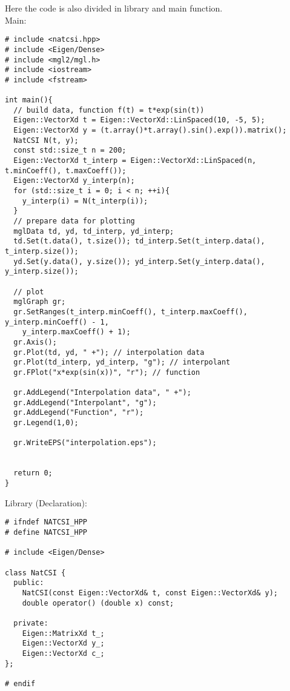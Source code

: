 \documentclass[a4paper]{article}
\begin{document}
Here the code is also divided in library and main function. \\
Main:
\begin{verbatim}
# include <natcsi.hpp>
# include <Eigen/Dense>
# include <mgl2/mgl.h>
# include <iostream>
# include <fstream>

int main(){
  // build data, function f(t) = t*exp(sin(t))
  Eigen::VectorXd t = Eigen::VectorXd::LinSpaced(10, -5, 5);
  Eigen::VectorXd y = (t.array()*t.array().sin().exp()).matrix();
  NatCSI N(t, y);
  const std::size_t n = 200;
  Eigen::VectorXd t_interp = Eigen::VectorXd::LinSpaced(n, t.minCoeff(), t.maxCoeff());
  Eigen::VectorXd y_interp(n);
  for (std::size_t i = 0; i < n; ++i){
    y_interp(i) = N(t_interp(i));
  }
  // prepare data for plotting
  mglData td, yd, td_interp, yd_interp;
  td.Set(t.data(), t.size()); td_interp.Set(t_interp.data(), t_interp.size());
  yd.Set(y.data(), y.size()); yd_interp.Set(y_interp.data(), y_interp.size());

  // plot
  mglGraph gr;
  gr.SetRanges(t_interp.minCoeff(), t_interp.maxCoeff(), y_interp.minCoeff() - 1, 
    y_interp.maxCoeff() + 1);
  gr.Axis();
  gr.Plot(td, yd, " +"); // interpolation data
  gr.Plot(td_interp, yd_interp, "g"); // interpolant
  gr.FPlot("x*exp(sin(x))", "r"); // function
  
  gr.AddLegend("Interpolation data", " +");
  gr.AddLegend("Interpolant", "g");
  gr.AddLegend("Function", "r");
  gr.Legend(1,0);

  gr.WriteEPS("interpolation.eps");


  return 0;
}
\end{verbatim}

Library (Declaration):
\begin{verbatim}
# ifndef NATCSI_HPP
# define NATCSI_HPP

# include <Eigen/Dense>

class NatCSI {
  public:
    NatCSI(const Eigen::VectorXd& t, const Eigen::VectorXd& y);
    double operator() (double x) const;

  private:
    Eigen::MatrixXd t_;
    Eigen::VectorXd y_;
    Eigen::VectorXd c_;
};

# endif
\end{verbatim}
\end{document}

